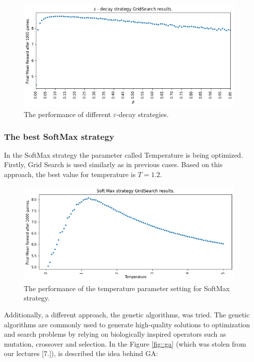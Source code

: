 \documentclass[11pt,american,czech]{article}
\begin{document}
\begin{figure}[h]
	\centering
	\includegraphics[scale=0.55]{e_decay.png}
	\caption{The performance of different $\varepsilon$-decay strategies.}\label{fig::e_decay}
\end{figure}

\newpage
\subsubsection*{The best SoftMax strategy}
In the SoftMax strategy the parameter called Temperature is being optimized. Firstly, Grid Search is used similarly as in previous cases. Based on this approach, the best value for temperature is $T=1.2$.
\begin{figure}[h]
	\centering
	\includegraphics[scale=0.6]{SM.png}
	\caption{The performance of the temperature parameter setting for SoftMax strategy.}\label{fig::SM}
\end{figure}

Additionally, a different approach, the genetic algorithms, was tried. The genetic algorithms are commonly used to generate high-quality solutions to optimization and search problems by relying on biologically inspired operators such as mutation, crossover and selection. In the Figure \ref{fig::ga} (which was stolen from our lectures [7.]), is described the idea behind GA:
\end{document}
